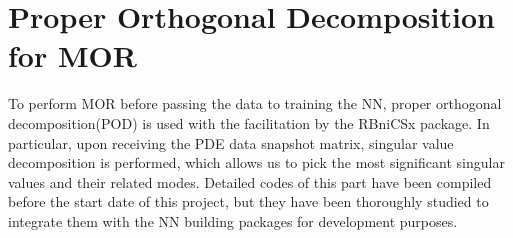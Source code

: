 \section{Proper Orthogonal Decomposition for MOR}

To perform MOR before passing the data to training the NN, proper orthogonal decomposition(POD) is used with the facilitation by the RBniCSx package. In particular, upon receiving the PDE data snapshot matrix, singular value decomposition is performed, which allows us to pick the most significant singular values and their related modes. Detailed codes of this part have been compiled before the start date of this project, but they have been thoroughly studied to integrate them with the NN building packages for development purposes. 